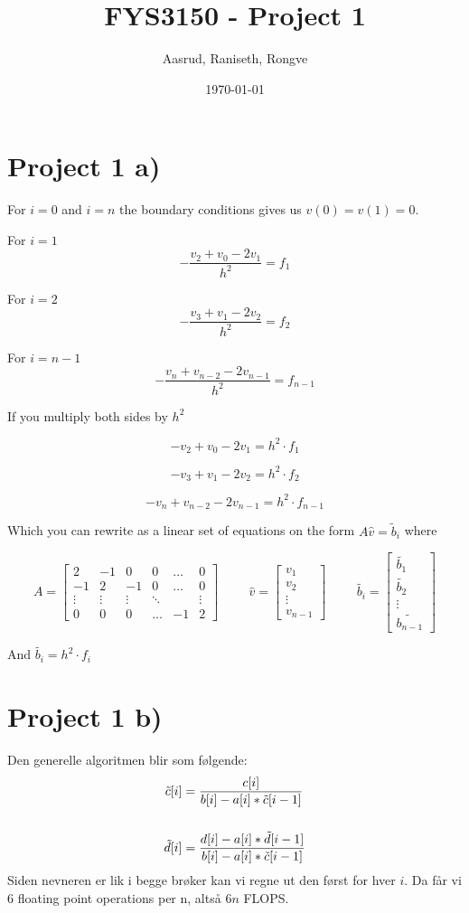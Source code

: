\documentclass{article}
\title{FYS3150 - Project 1}
\author{Aasrud, Raniseth, Rongve}
\date{\today}
\begin{document}
\maketitle

\section*{Project 1 a)}

For $i = 0$ and $i = n$ the boundary conditions gives us
$v(0) = v(1) = 0$.

For $i = 1$
\[-\frac{v_2+v_0-2v_1}{h^2} = f_1\]

For $i = 2$\\
\[-\frac{v_3+v_1-2v_2}{h^2}{} = f_2\]

For $i = n-1$
\[-\frac{v_n+v_{n-2}-2v_{n-1}}{h^2}{} = f_{n-1}\]

If you multiply both sides by $h^2$

\[-{v_2+v_0-2v_1} = h^2\cdot{f_1}\]

\[-{v_3+v_1-2v_2} = {h^2}\cdot{f_2}\]

\[-v_n+v_{n-2}-2v_{n-1} = {h^2}\cdot{f_{n-1}}\]

Which you can rewrite as a linear set of equations on the form $A\hat{v} = \tilde{b}_i$ where

\[ A = \begin{bmatrix}
2 & -1 & 0 & 0 & \hdots & 0\\
-1 & 2 & -1 & 0 & \hdots & 0\\
\vdots & \vdots & \vdots & \ddots & & \vdots\\
0 & 0 & 0 & \hdots & -1 & 2
 \end{bmatrix}\hspace{1cm}
 \hat{v} = \begin{bmatrix}
 v_1\\
v_2\\
\vdots\\
v_{n-1}
 \end{bmatrix}\hspace{1cm}
 \tilde{b_i} = \begin{bmatrix}
 \tilde{b_1}\\
\tilde{b_2}\\
\vdots\\
\tilde{b_{n-1}}
 \end{bmatrix}
 \]

And $\tilde{b_i} = h^2 \cdot f_i$

\section*{Project 1 b)}
Den generelle algoritmen blir som følgende:
\begin{align*}
  \tilde{c}[i] &= \frac{c[i]}{b[i]-a[i]*\tilde{c}[i-1]}\\
  \vspace{1cm}\\
  \tilde{d}[i] &= \frac{d[i]-a[i]*\tilde{d}[i-1]}{b[i]-a[i]*\tilde{c}[i-1]}
\end{align*}
Siden nevneren er lik i begge brøker kan vi regne ut den først for hver $i$.
Da får vi $6$ floating point operations per n, altså $6n$ FLOPS.
\end{document}
